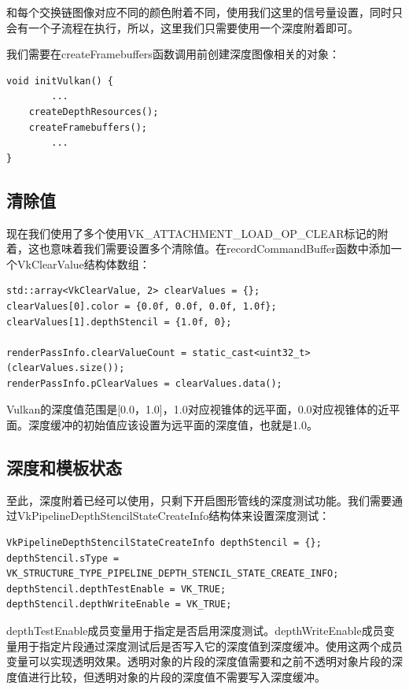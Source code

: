 \documentclass{ctexart}
\begin{document}
和每个交换链图像对应不同的颜色附着不同，使用我们这里的信号量设置，同时只会有一个子流程在执行，所以，这里我们只需要使用一个深度附着即可。

我们需要在createFramebuffers函数调用前创建深度图像相关的对象：

\begin{lstlisting}[language={[ANSI]C}]
void initVulkan() {
		...
	createDepthResources();
	createFramebuffers();
		...
}
\end{lstlisting}

\subsection{清除值}

现在我们使用了多个使用VK\_ATTACHMENT\_LOAD\_OP\_CLEAR标记的附着，这也意味着我们需要设置多个清除值。在recordCommandBuffer函数中添加一个VkClearValue结构体数组：

\begin{lstlisting}[language={[ANSI]C}]
std::array<VkClearValue, 2> clearValues = {};
clearValues[0].color = {0.0f, 0.0f, 0.0f, 1.0f};
clearValues[1].depthStencil = {1.0f, 0};

renderPassInfo.clearValueCount = static_cast<uint32_t>(clearValues.size());
renderPassInfo.pClearValues = clearValues.data();
\end{lstlisting}

Vulkan的深度值范围是[0.0，1.0]，1.0对应视锥体的远平面，0.0对应视锥体的近平面。深度缓冲的初始值应该设置为远平面的深度值，也就是1.0。

\subsection{深度和模板状态}

至此，深度附着已经可以使用，只剩下开启图形管线的深度测试功能。我们需要通过VkPipelineDepthStencilStateCreateInfo结构体来设置深度测试：

\begin{lstlisting}[language={[ANSI]C}]
VkPipelineDepthStencilStateCreateInfo depthStencil = {};
depthStencil.sType = VK_STRUCTURE_TYPE_PIPELINE_DEPTH_STENCIL_STATE_CREATE_INFO;
depthStencil.depthTestEnable = VK_TRUE;
depthStencil.depthWriteEnable = VK_TRUE;
\end{lstlisting}

depthTestEnable成员变量用于指定是否启用深度测试。depthWriteEnable成员变量用于指定片段通过深度测试后是否写入它的深度值到深度缓冲。使用这两个成员变量可以实现透明效果。透明对象的片段的深度值需要和之前不透明对象片段的深度值进行比较，但透明对象的片段的深度值不需要写入深度缓冲。
\end{document}
